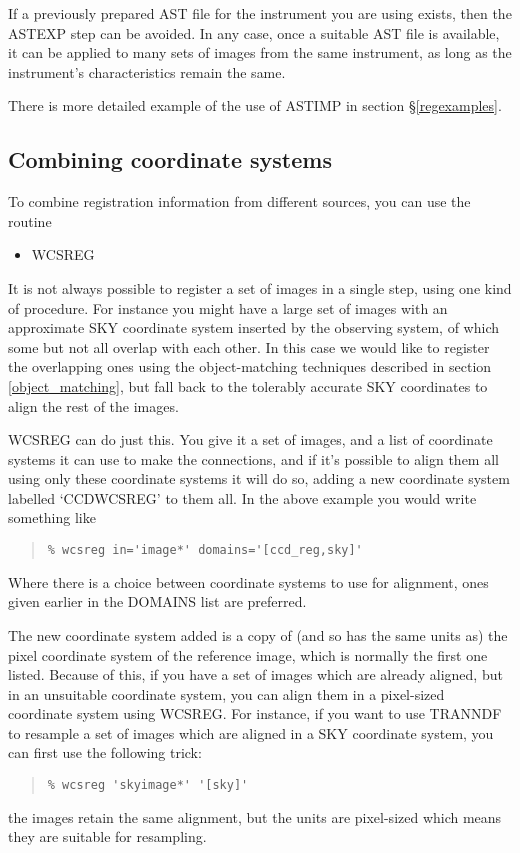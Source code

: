 \documentclass[twoside,11pt]{article}
\newcommand{\htmlref}[2]{#1}
\newcommand{\xlabel}[1]{}
\renewcommand{\_}{\texttt{\symbol{95}}}
\newenvironment{myquote}{\begin{quote}\begin{small}}{\end{small}\end{quote}}
\newcommand{\routine}[1]{{\sc #1}}
\newcommand{\xroutine}[1]{\htmlref{{\sc #1}}{#1}}
\begin{document}
If a previously prepared AST file for the instrument you are using
exists, then the \routine{ASTEXP} step can be avoided.
In any case, once a suitable AST file is available, 
it can be applied to many sets of images from the same instrument,
as long as the instrument's characteristics remain the same.

There is more detailed example of the use of \routine{ASTIMP} in 
section \S\ref{regexamples}.



\subsection{\xlabel{wcscombine}\label{wcscombine}Combining coordinate systems}

To combine registration information from different sources, you can
use the routine
\begin{itemize}
\item \xroutine{WCSREG}
\end{itemize}

It is not always possible to register a set of images in a single
step, using one kind of procedure.  For instance you might have
a large set of images with an approximate SKY coordinate system
inserted by the observing system, 
of which some but not all overlap with each other.
In this case we would like to register the overlapping ones
using the object-matching
techniques described in section \ref{object_matching},
but fall back to
the tolerably accurate SKY coordinates to align the rest of the images. 

\routine{WCSREG} can do just this.
You give it a set of images, and a list of coordinate systems
it can use to make the connections,
and if it's possible to align them all using only these coordinate
systems it will do so,
adding a new coordinate system labelled `CCD\_WCSREG' to them all.
In the above example you would write something like
\begin{myquote}
\begin{verbatim}
% wcsreg in='image*' domains='[ccd_reg,sky]'
\end{verbatim}
\end{myquote}
Where there is a choice between coordinate systems to use for alignment,
ones given earlier in the DOMAINS list are preferred.

The new coordinate system added is a copy of (and so has the same
units as) the pixel coordinate system of the reference image,
which is normally the first one listed.
Because of this, if you have
a set of images which are already aligned, but in an 
unsuitable coordinate system, 
you can align them in a pixel-sized coordinate system using
\routine{WCSREG}. 
For instance, if you want to use \xroutine{TRANNDF} 
to resample a set of images
which are aligned in a SKY coordinate system, you can first use the
following trick:
\begin{myquote}
\begin{verbatim}
% wcsreg 'skyimage*' '[sky]'
\end{verbatim}
\end{myquote}
the images retain the same alignment, but the units are pixel-sized
which means they are suitable for resampling.
\end{document}
